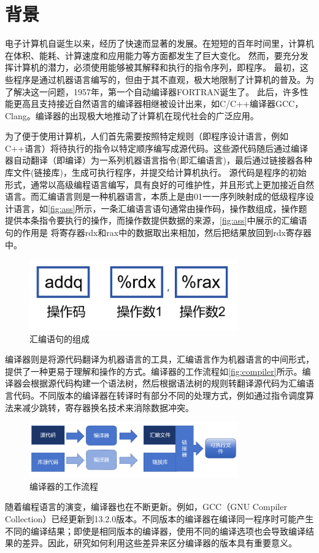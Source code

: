 \section{背景}
电子计算机自诞生以来，经历了快速而显著的发展。在短短的百年时间里，计算机在体积、能耗、计算速度和应用能力等方面都发生了巨大变化。
然而，要充分发挥计算机的潜力，必须使用能够被其解释和执行的指令序列，即程序。
最初，这些程序是通过机器语言编写的，但由于其不直观，极大地限制了计算机的普及。为了解决这一问题，1957年，第一个自动编译器FORTRAN诞生了。
此后，许多性能更高且支持接近自然语言的编译器相继被设计出来，如C/C++编译器GCC，Clang。编译器的出现极大地推动了计算机在现代社会的广泛应用。

\par
为了便于使用计算机，人们首先需要按照特定规则（即程序设计语言，例如C++语言）将待执行的指令以特定顺序编写成源代码。这些源代码随后通过编译器自动翻译（即编译）为一系列机器语言指令(即汇编语言)，最后通过链接器各种库文件(链接库)，生成可执行程序，并提交给计算机执行。
源代码是程序的初始形式，通常以高级编程语言编写，具有良好的可维护性，并且形式上更加接近自然语言。而汇编语言则是一种机器语言，本质上是由01一一序列映射成的低级程序设计语言，如\autoref{fig:ass}所示，一条汇编语言语句通常由操作码，操作数组成，操作题提供本条指令要执行的操作，而操作数提供数据的来源，\autoref{fig:ass}中展示的汇编语句的作用是 将寄存器rdx和rax中的数据取出来相加，然后把结果放回到rdx寄存器中。
\begin{figure}[H]
    \centering
    \includegraphics[width=0.8\textwidth]{figures/ass.png}
    \caption{汇编语句的组成}
    \label{fig:ass}
\end{figure}
编译器则是将源代码翻译为机器语言的工具，汇编语言作为机器语言的中间形式，提供了一种更易于理解和操作的方式。编译器的工作流程如\autoref{fig:compiler}所示。编译器会根据源代码构建一个语法树，然后根据语法树的规则转翻译源代码为汇编语言代码。不同版本的编译器在转译时有部分不同的处理方式，例如通过指令调度算法来减少跳转，寄存器换名技术来消除数据冲突。
\begin{figure}[H]
    \centering
    \includegraphics[width=0.8\textwidth]{figures/compiler.png}
    \caption{编译器的工作流程}
    \label{fig:compiler}
\end{figure}
随着编程语言的演变，编译器也在不断更新。例如，GCC（GNU Compiler Collection）已经更新到13.2.0版本。不同版本的编译器在编译同一程序时可能产生不同的编译结果；即使是相同版本的编译器，使用不同的编译选项也会导致编译结果的差异。因此，研究如何利用这些差异来区分编译器的版本具有重要意义。
\par
